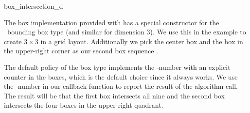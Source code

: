 \begin{ccRefFunction}{box_intersection_d}
\ccExample

The box implementation provided with
 has a special
constructor for the \cgal\ bounding box type  (and
similar for dimension 3). We use this in the example to create $3
\times 3$  in a grid layout. Additionally we pick the
center box and the box in the upper-right corner as our second box
sequence .

The default policy of the box type implements the -number with
an explicit counter in the boxes, which is the default choice since it
always works. We use the -number in our callback function to
report the result of the  algorithm call. The result will
be that the first  box intersects all nine  and
the second  box intersects the four boxes in the
upper-right quadrant.


\end{ccRefFunction}



